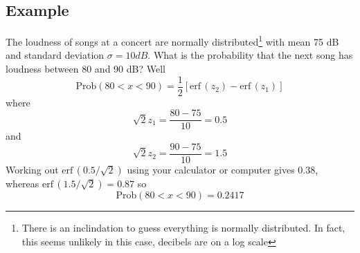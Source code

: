 \documentclass[11pt,a4paper]{scrartcl}
\begin{document}
\subsection*{Example}

The loudness of songs at a concert are normally distributed\footnote{There is an inclindation to guess everything is normally distributed. In fact, this seems unlikely in this case, decibels are on a log scale}  with mean 75 dB and standard deviation $\sigma=10 dB$. What is the probability that the next song has loudness between 80 and 90 dB? Well
\begin{equation}
\mbox{Prob}(80<x<90)=\frac{1}{2}[\mbox{erf}\,(z_2)-\mbox{erf}\,(z_1)]
\end{equation}
where 
\begin{equation}
\sqrt{2}z_1=\frac{80-75}{10}=0.5
\end{equation}
and 
\begin{equation}
\sqrt{2}z_2=\frac{90-75}{10}=1.5
\end{equation}
Working out $\mbox{erf}\,(0.5/\sqrt{2})$ using your calculator or computer gives 0.38, whereas $\mbox{erf}\,(1.5/\sqrt{2})=0.87$ so
\begin{equation}
\mbox{Prob}(80<x<90)=0.2417
\end{equation}

\newpage


\end{document}
